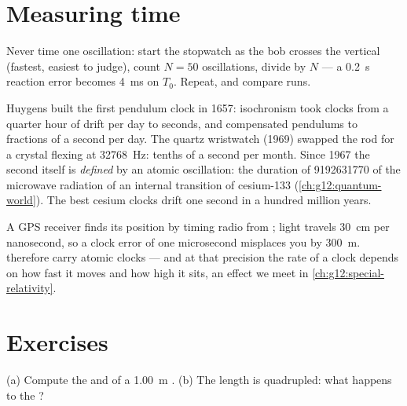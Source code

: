 \section{Measuring time}

\begin{method}\label{met:g12:oscillators-and-time:timing}
Never time one oscillation: start the stopwatch as the bob crosses
the vertical (fastest, easiest to judge), count $N = 50$ oscillations,
divide by $N$ --- a \qty{0.2}{s} reaction error becomes \qty{4}{ms}
on $T_0$. Repeat, and compare runs.
\end{method}

\begin{example}\label{ex:g12:oscillators-and-time:clocks}
Huygens built the first pendulum clock in \num{1657}: isochronism
took clocks from a quarter hour of drift per day to seconds, and
compensated pendulums to fractions of a second per day. The quartz
wristwatch (\num{1969}) swapped the rod for a crystal flexing at
\qty{32768}{Hz}: tenths of a second per month. Since \num{1967} the
second itself is \emph{defined} by an atomic oscillation: the
duration of \num{9192631770}  of the microwave radiation of an
internal transition of cesium-133 (\cref{ch:g12:quantum-world}). The
best cesium clocks drift one second in a hundred million years.
\end{example}

\begin{remark}\label{rem:g12:oscillators-and-time:gps}
A GPS receiver finds its position by timing radio  from
; light travels \qty{30}{cm} per nanosecond, so a clock
error of one microsecond misplaces you by \qty{300}{m}. 
therefore carry atomic clocks --- and at that precision the rate of a
clock depends on how fast it moves and how high it sits, an effect we
meet in \cref{ch:g12:special-relativity}.
\end{remark}

\section{Exercises}

\begin{exercise}[$\star$]\label{exo:g12:oscillators-and-time:1}
(a) Compute the  and  of a \qty{1.00}{m} . (b) The length is quadrupled: what happens to the ?
\end{exercise}

